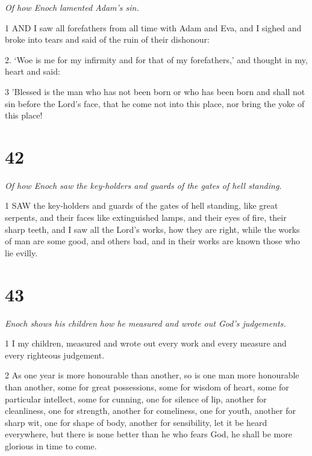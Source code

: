 \par \textit{Of how Enoch lamented Adam's sin.}

\par 1 AND I saw all forefathers from all time with Adam and Eva, and I sighed and broke into tears and said of the ruin of their dishonour:

\par 2. ‘Woe is me for my infirmity and for that of my forefathers,’ and thought in my, heart and said:

\par 3 'Blessed is the man who has not been born or who has been born and shall not sin before the Lord's face, that he come not into this place, nor bring the yoke of this place!

\chapter{42}

\par \textit{Of how Enoch saw the key-holders and guards of the gates of hell standing.}

\par 1 SAW the key-holders and guards of the gates of hell standing, like great serpents, and their faces like extinguished lamps, and their eyes of fire, their sharp teeth, and I saw all the Lord's works, how they are right, while the works of man are some good, and others bad, and in their works are known those who lie evilly.

\chapter{43}

\par \textit{Enoch shows his children how he measured and wrote out God's judgements.}

\par 1 I my children, measured and wrote out every work and every measure and every righteous judgement.

\par 2 As one year is more honourable than another, so is one man more honourable than another, some for great possessions, some for wisdom of heart, some for particular intellect, some for cunning, one for silence of lip, another for cleanliness, one for strength, another for comeliness, one for youth, another for sharp wit, one for shape of body, another for sensibility, let it be heard everywhere, but there is none better than he who fears God, he shall be more glorious in time to come.

